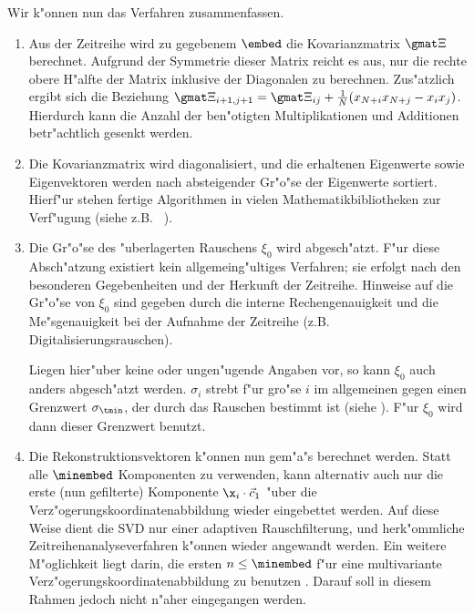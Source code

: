 Wir k"onnen nun das Verfahren zusammenfassen.
\begin{enumerate}
\item Aus der Zeitreihe wird zu gegebenem $\embed$ die Kovarianzmatrix $\gmat \Xi$
  berechnet.  Aufgrund der Symmetrie dieser Matrix reicht es
  aus, nur die rechte obere H"alfte der Matrix inklusive der Diagonalen zu berechnen. Zus"atzlich ergibt sich
   die Beziehung
  $\gmat\Xi_{i+1,j+1}=\gmat\Xi_{ij}+\frac{1}{N}(x_{N+i}x_{N+j}-x_ix_j)$. Hierdurch kann
  die Anzahl der ben"otigten Multiplikationen und Additionen betr"achtlich gesenkt werden.
\item Die Kovarianzmatrix wird diagonalisiert, und die erhaltenen Eigenwerte sowie
  Eigenvektoren werden nach absteigender Gr"o"se der Eigenwerte sortiert.  Hierf"ur stehen
  fertige Algorithmen in vielen Mathematikbibliotheken zur Verf"ugung (siehe z.B.~ \cite{Numerical-recipes}).
\item Die Gr"o"se des "uberlagerten Rauschens $\xi_0$ wird abgesch"atzt.  F"ur diese
  Absch"atzung existiert kein allgemeing"ultiges Verfahren;  sie erfolgt nach den
  besonderen Gegebenheiten und der Herkunft der Zeitreihe.  Hinweise auf die Gr"o"se von
  $\xi_0$ sind gegeben durch die interne Rechengenauigkeit und die Me"sgenauigkeit bei der
  Aufnahme der Zeitreihe (z.B. Digitalisierungsrauschen).
  
  Liegen hier"uber keine oder ungen"ugende Angaben vor, so kann $\xi_0$ auch anders
  abgesch"atzt werden.  $\sigma_i$ strebt f"ur gro"se $i$ im allgemeinen gegen einen Grenzwert
  $\sigma_\tmin$, der durch das Rauschen bestimmt ist (siehe ). F"ur
  $\xi_0$ wird dann dieser Grenzwert benutzt.
\item Die Rekonstruktionsvektoren k"onnen nun gem"a"s  berechnet werden.
  Statt alle $\minembed$ Komponenten zu verwenden, kann alternativ auch nur die
  erste (nun gefilterte) Komponente $\x_i\cdot\vec c_1$ "uber die
  Verz"ogerungskoordinatenabbildung wieder eingebettet werden.  Auf diese Weise dient die
  SVD nur einer adaptiven Rauschfilterung, und herk"ommliche Zeitreihenanalyseverfahren
  k"onnen wieder angewandt werden.  Ein weitere M"oglichkeit liegt darin, die ersten
  $n\leq\minembed$ f"ur eine multivariante Verz"ogerungskoordinatenabbildung zu benutzen
  \cite{Fraedrich-wang}.  Darauf soll in diesem Rahmen jedoch nicht n"aher eingegangen
  werden.
\end{enumerate}

